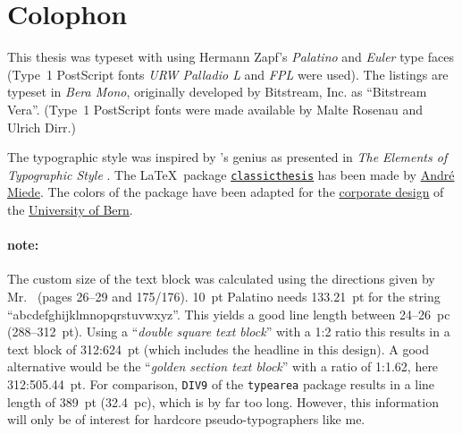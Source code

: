 \pagestyle{empty}
\hfill
\vfill
\section*{Colophon}
This thesis was typeset with \href{http://www.latex-project.org/}{\LaTeXe} using Hermann Zapf's \emph{Palatino} and \emph{Euler} type faces (Type~1 PostScript fonts \emph{URW Palladio L} and \emph{FPL} were used). The listings are typeset in \emph{Bera Mono}, originally developed by Bitstream, Inc. as ``Bitstream Vera''. (Type~1 PostScript fonts were made available by Malte Rosenau and Ulrich Dirr.)

The typographic style was inspired by 's genius as presented in \emph{The Elements of Typographic Style} \citep{bringhurst:2002}. The \LaTeX\ package \href{http://www.ctan.org/tex-archive/macros/latex/contrib/classicthesis/}{\texttt{classicthesis}} has been made by \href{http://www.miede.de}{André Miede}. The colors of the package have been adapted for the \href{http://www.kommunikation.unibe.ch/intern/content/beratung/corporate_design/logo_schriften__farben/}{corporate design} of the \href{http://www.unibe.ch/}{University of Bern}.

\paragraph{note:} The custom size of the text block was calculated using the directions given by Mr.\ \citeauthor{bringhurst:2002} (pages 26--29 and 175/176). \SI{10}{pt} Palatino needs \SI{133.21}{pt} for the string ``abcdefghijklmnopqrstuvwxyz''. This yields a good line length between 24--\SI{26}{pc} (288--\SI{312}{pt}). Using a ``\emph{double square text block}'' with a 1:2 ratio this results in a text block of 312:\SI{624}{pt} (which includes the headline in this design). A good alternative would be the ``\emph{golden section text block}'' with a ratio of 1:1.62, here 312:\SI{505.44}{pt}. For comparison, \texttt{DIV9} of the \texttt{typearea} package results in a line length of \SI{389}{pt} (\SI{32.4}{pc}), which is by far too long. However, this information will only be of interest for hardcore pseudo-typographers like me.
%
%

\bigskip

\noindent\finalVersionString